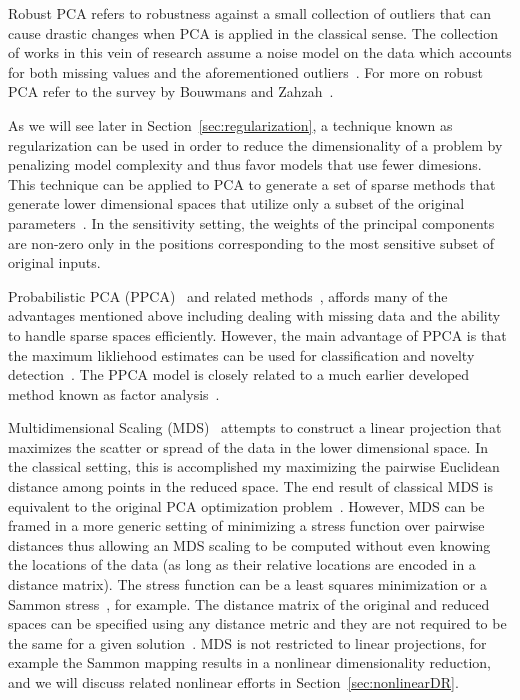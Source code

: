 Robust PCA refers to robustness against a small collection of outliers that can cause drastic changes when PCA is applied in the classical sense.
%
The collection of works in this vein of research assume a noise model on the data which accounts for both missing values and the aforementioned outliers~\cite{CandesLiMa2011,Choulakian2006,GalpinHawkins1987}.
%
For more on robust PCA refer to the survey by Bouwmans and Zahzah~\cite{BouwmansZahzah2014}.

As we will see later in Section~\ref{sec:regularization}, a technique known as regularization can be used in order to reduce the dimensionality of a problem by penalizing model complexity and thus favor models that use fewer dimesions.
%
This technique can be applied to PCA to generate a set of sparse methods that generate lower dimensional spaces that utilize only a subset of the original parameters~\cite{dAspremontBachGhaoui2008,dAspremontGhaouiJordan2007,JourneeNesterovRichtarik2010,ZouHastieTibshirani2006}.
%
In the sensitivity setting, the weights of the principal components are non-zero only in the positions corresponding to the most sensitive subset of original inputs.

Probabilistic PCA (PPCA)~\cite{TippingBishop1999} and related methods~\cite{Roweis1998,WellingAgakovWilliams2003,WilliamsAgakov2002}, affords many of the advantages mentioned above including dealing with missing data and the ability to handle sparse spaces efficiently.
%
However, the main advantage of PPCA is that the maximum likliehood estimates can be used for classification and novelty detection~\cite{TippingBishop1999}.
%
The PPCA model is closely related to a much earlier developed method known as factor analysis~\cite{Spearman1904b}.

Multidimensional Scaling (MDS)~\cite{BorgGroenen2005,CoxCox2000,Torgerson1952} attempts to construct a linear projection that maximizes the scatter or spread of the data in the lower dimensional space.
%
In the classical setting, this is accomplished my maximizing the pairwise Euclidean distance among points in the reduced space.
%
The end result of classical MDS is equivalent to the original PCA optimization problem~\cite{BorgGroenen2005,CoxCox2000,MardiaKentBibby1979,Williams2002}.
%
However, MDS can be framed in a more generic setting of minimizing a stress function over pairwise distances thus allowing an MDS scaling to be computed without even knowing the locations of the data (as long as their relative locations are encoded in a distance matrix).
%
The stress function can be a least squares minimization or a Sammon stress~\cite{Sammon1969}, for example.
%
The distance matrix of the original and reduced spaces can be specified using any distance metric and they are not required to be the same for a given solution~\cite{CunninghamGhahramani2015}.
%
MDS is not restricted to linear projections, for example the Sammon mapping results in a nonlinear dimensionality reduction, and we will discuss related nonlinear efforts in Section~\ref{sec:nonlinearDR}.


